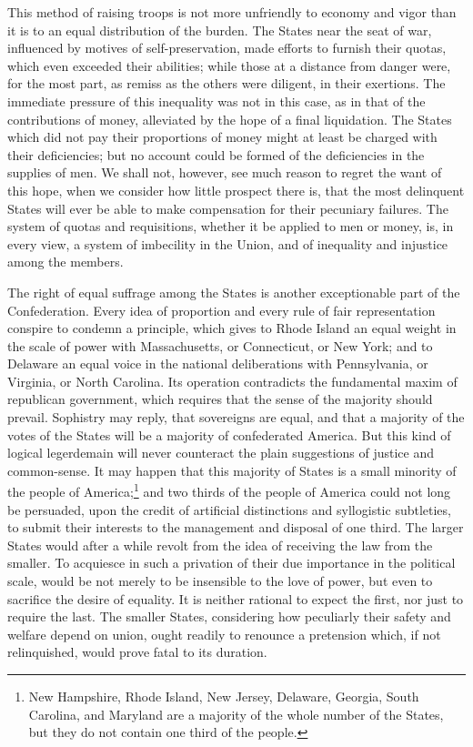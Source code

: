 This method of raising troops is not more unfriendly to economy and vigor than it is to an equal distribution of the burden. 
The States near the seat of war, influenced by motives of self-preservation, made efforts to furnish their quotas, which even exceeded their abilities; while those at a distance from danger were, for the most part, as remiss as the others were diligent, in their exertions. 
The immediate pressure of this inequality was not in this case, as in that of the contributions of money, alleviated by the hope of a final liquidation. 
The States which did not pay their proportions of money might at least be charged with their deficiencies; but no account could be formed of the deficiencies in the supplies of men. 
We shall not, however, see much reason to regret the want of this hope, when we consider how little prospect there is, that the most delinquent States will ever be able to make compensation for their pecuniary failures. 
The system of quotas and requisitions, whether it be applied to men or money, is, in every view, a system of imbecility in the Union, and of inequality and injustice among the members.

The right of equal suffrage among the States is another exceptionable part of the Confederation. 
Every idea of proportion and every rule of fair representation conspire to condemn a principle, which gives to Rhode Island an equal weight in the scale of power with Massachusetts, or Connecticut, or New York; and to Delaware an equal voice in the national deliberations with Pennsylvania, or Virginia, or North Carolina. 
Its operation contradicts the fundamental maxim of republican government, which requires that the sense of the majority should prevail. 
Sophistry may reply, that sovereigns are equal, and that a majority of the votes of the States will be a majority of confederated America. 
But this kind of logical legerdemain will never counteract the plain suggestions of justice and common-sense. 
It may happen that this majority of States is a small minority of the people of America;\footnote{New Hampshire, Rhode Island, New Jersey, Delaware, Georgia, South Carolina, and Maryland are a majority of the whole number of the States, but they do not contain one third of the people.} and two thirds of the people of America could not long be persuaded, upon the credit of artificial distinctions and syllogistic subtleties, to submit their interests to the management and disposal of one third. 
The larger States would after a while revolt from the idea of receiving the law from the smaller. 
To acquiesce in such a privation of their due importance in the political scale, would be not merely to be insensible to the love of power, but even to sacrifice the desire of equality. 
It is neither rational to expect the first, nor just to require the last. 
The smaller States, considering how peculiarly their safety and welfare depend on union, ought readily to renounce a pretension which, if not relinquished, would prove fatal to its duration.

